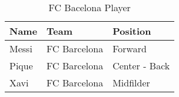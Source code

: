 
\setlength{\arrayrulewidth}{.1mm}   %
\setlength{\tabcolsep}{20pt}     %
\renewcommand{\arraystretch}{2}     %


\begin{table}[!htbp]
    \centering
    \begin{tabular}{|l|l|l|}
    \hline
      Name  & Team         & Position      \\ \hline
      Messi & FC Barcelona & Forward       \\ \hline
      Pique & FC Barcelona & Center - Back \\ \hline
      Xavi  & FC Barcelona & Midfilder     \\ \hline
    \end{tabular}
    \caption{FC Bacelona Player}
    \label{tab:my_label}
\end{table}

